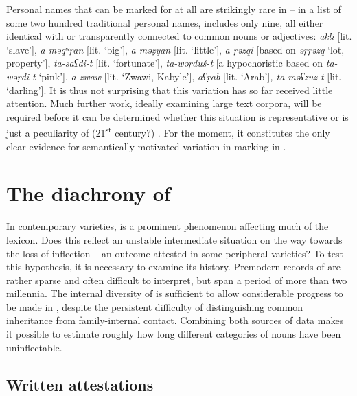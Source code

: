\documentclass[output=paper,colorlinks,citecolor=brown]{langscibook}
\begin{document}
Personal names that can be marked for  at all are strikingly rare in  -- in a list of some two hundred traditional personal names, \citet[1027--1035]{dallet1982} includes only nine, all either identical with or transparently connected to common nouns or adjectives: \emph{akli} [lit. `slave'], \emph{a-məqʷṛan} [lit. `big'], \emph{a-məẓyan} [lit. `little'], \emph{a-ṛəzqi} [based on \emph{əṛṛəzq} `lot, property'], \emph{ta-saʕdi-t} [lit. `fortunate'], \emph{ta-wəṛduš-t} [a hypochoristic based on \emph{ta-wəṛdi-t} `pink'], \emph{a-zwaw} [lit. `Zwawi, Kabyle'], \emph{aʕṛab} [lit. `Arab']\emph{, ta-məʕzuz-t} [lit. `darling']. It is thus not surprising that this variation has so far received little attention. Much further work, ideally examining large text corpora, will be required before it can be determined whether this situation is representative or is just a peculiarity of (21\textsuperscript{st} century?) . For the moment, it constitutes the only clear evidence for semantically motivated variation in  marking in .

\section{The diachrony of  } \label{13sec3}

In contemporary  varieties,   is a prominent phenomenon affecting much of the lexicon. Does this reflect an unstable intermediate situation on the way towards the loss of  inflection -- an outcome attested in some peripheral varieties? To test this hypothesis, it is necessary to examine its history. Premodern records of  are rather sparse and often difficult to interpret, but span a period of more than two millennia. The internal diversity of  is sufficient to allow considerable progress to be made in , despite the persistent difficulty of distinguishing common inheritance from family-internal contact. Combining both sources of data makes it possible to estimate roughly how long different categories of nouns have
been uninflectable.

\subsection{Written attestations} \label{13sec3.1}
\end{document}
